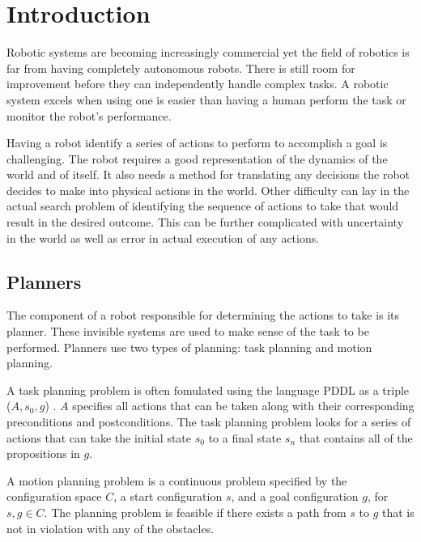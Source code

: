 \chapter{Introduction} \label{intro}
Robotic systems are becoming increasingly commercial yet the field of robotics is far from having completely autonomous robots. There is still room for improvement before they can independently handle complex tasks. A robotic system excels when using one is easier than having a human perform the task or monitor the robot's performance.

Having a robot identify a series of actions to perform to accomplish a goal is challenging. The robot requires a good representation of the dynamics of the world and of itself. It also needs a method for translating any decisions the robot decides to make into physical actions in the world. Other difficulty can lay in the actual search problem of identifying the sequence of actions to take that would result in the desired outcome. This can be further complicated with uncertainty in the world as well as error in actual execution of any actions.

\section{Planners} \label{intro:planners}
The component of a robot responsible for determining the actions to take is its planner. These invisible systems are used to make sense of the task to be performed. Planners use two types of planning: task planning and motion planning. 

A task planning problem is often fomulated using the language PDDL as a triple ($A, s_0, g$) \cite{srivastava:interface}. $A$ specifies all actions that can be taken along with their corresponding preconditions and postconditions. The task planning problem looks for a series of actions that can take the initial state $s_0$ to a final state $s_{n}$ that contains all of the propositions in $g$.

A motion planning problem is a continuous problem specified by the configuration space $C$, a start configuration $s$, and a goal configuration $g$, for $s,g \in C$. The planning problem is feasible if there exists a path from $s$ to $g$ that is not in violation with any of the obstacles.

